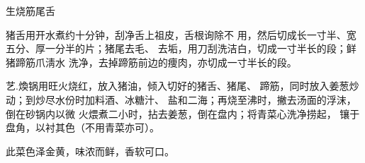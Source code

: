 \begin{recipe}{生烧筋尾舌}

\ingredients


\cooking

\step 猪舌用开水煮约十分钟，刮净舌上祖皮，舌根询除不 用，然后切成长一寸半、宽五分、厚一分半的片；猪尾去毛、 去垢，用刀刮洗洁白，切成一寸半长的段；鲜猪蹄筋爪淸水 洗净，去掉蹄筋前边的痩肉，亦切成一寸半长的段。

艺.煥锅用旺火烧红，放入猪油，倾入切好的猪舌、猪尾、 蹄筋，同时放入姜葱炒动；到炒尽水份时加料酒、冰糖汁、 盐和二海；再烧至沸时，撇去汤面的浮沫，倒在砂锅内以微 火煨煮二小时，拈去姜葱，倒在盘内；将青菜心洗净捞起， 镶于盘角，以衬其色（不用青菜亦可）。

\notes

此菜色泽金黄，味浓而鲜，香软可口。

\end{recipe}

